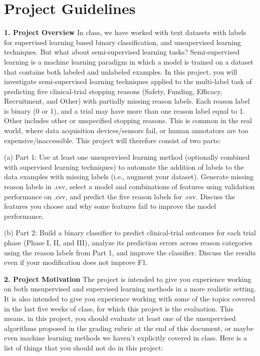 \documentclass[11pt,letterpaper]{article}
\begin{document}
\section*{Project Guidelines}

\textbf{1. Project Overview} In class, we have worked with text datasets with labels for supervised learning based binary classification, and unsupervised learning techniques. But what about semi-supervised learning tasks? Semi-supervised learning is a machine learning paradigm in which a model is trained on a dataset that contains both labeled and unlabeled examples. In this project, you will investigate semi-supervised learning techniques applied to the multi-label task of predicting five clinical-trial stopping reasons (Safety, Funding, Efficacy, Recruitment, and Other) with partially missing reason labels. Each reason label is binary (0 or 1), and a trial may have more than one reason label equal to 1. Other includes other or unspecified stopping reasons. This is common in the real world, where data acquisition devices/sensors fail, or human annotators are too expensive/inaccessible. This project will therefore consist of two parts:

(a) Part 1: Use at least one unsupervised learning method (optionally combined with supervised
learning techniques) to automate the addition of labels to the data examples with missing labels
(i.e., augment your dataset). Generate missing reason labels in .csv, select a
model and combinations of features using validation performance on .csv, and predict
the five reason labels for .csv. Discuss the features you choose and why some
features fail to improve the model performance.

(b) Part 2: Build a binary classifier to predict clinical-trial outcomes for each trial phase (Phase
I, II, and III), analyze its prediction errors across reason categories using the reason labels from
Part 1, and improve the classifier. Discuss the results even if your modification does not improve
F1.

\textbf{2. Project Motivation} The project is intended to give you experience working on both unsupervised and supervised learning methods in a more realistic setting. It is also intended to give you experience working with some of the topics covered in the last five weeks of class, for which this project is the evaluation. This means, in this project, you should evaluate at least one of the unsupervised algorithms proposed in the grading rubric at the end of this document, or maybe even machine learning methods we haven't explicitly covered in class. Here is a list of things that you should not do in this project:
\end{document}
